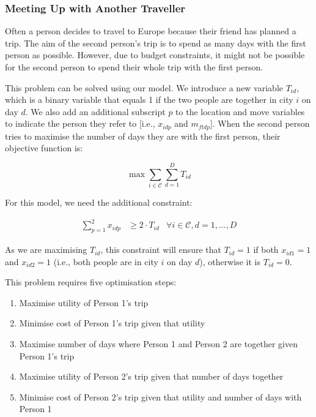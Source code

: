 \documentclass[12pt]{article}
\begin{document}
\subsubsection{Meeting Up with Another Traveller}

Often a person decides to travel to Europe because their friend has planned a trip. The aim of the second person's trip is to spend as many days with the first person as possible. However, due to budget constraints, it might not be possible for the second person to spend their whole trip with the first person.

This problem can be solved using our model. We introduce a new variable $T_{id}$, which is a binary variable that equals 1 if the two people are together in city $i$ on day $d$. We also add an additional subscript $p$ to the location and move variables to indicate the person they refer to [i.e., $x_{idp}$ and $m_{ftdp}$]. When the second person tries to maximise the number of days they are with the first person, their objective function is:

\begin{equation*}
	\max \sum_{i \in \mathcal{C}} \sum_{d = 1}^{D} T_{id}
\end{equation*}

For this model, we need the additional constraint:

\begin{align}
	\sum_{p = 1}^{2} x_{idp} & \geq 2 \cdot T_{id} & \forall i \in \mathcal{C}, d = 1, \ldots, D
\end{align}

As we are maximising $T_{id}$, this constraint will ensure that $T_{id} = 1$ if both $x_{id1} = 1$ and $x_{id2} = 1$ (i.e., both people are in city $i$ on day $d$), otherwise it is $T_{id} = 0$.

This problem requires five optimisation steps:

\begin{enumerate}
	\item Maximise utility of Person 1's trip
	\item Minimise cost of Person 1's trip given that utility
	\item Maximise number of days where Person 1 and Person 2 are together given Person 1's trip
	\item Maximise utility of Person 2's trip given that number of days together
	\item Minimise cost of Person 2's trip given that utility and number of days with Person 1
\end{enumerate}
\end{document}
